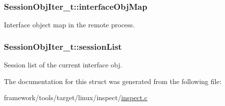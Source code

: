 \subsubsection[{\texorpdfstring{interface\+Obj\+Map}{interfaceObjMap}}]{ Session\+Obj\+Iter\+\_\+t\+::interface\+Obj\+Map}\hypertarget{struct_session_obj_iter__t_ac3db9e07ac50a35f02c9bc6dd5e09ae1}{}\label{struct_session_obj_iter__t_ac3db9e07ac50a35f02c9bc6dd5e09ae1}


Interface object map in the remote process. 

\subsubsection[{\texorpdfstring{session\+List}{sessionList}}]{ Session\+Obj\+Iter\+\_\+t\+::session\+List}\hypertarget{struct_session_obj_iter__t_ac94a6770e7d8c8d0c8fc85e93f0297a7}{}\label{struct_session_obj_iter__t_ac94a6770e7d8c8d0c8fc85e93f0297a7}


Session list of the current interface obj. 



The documentation for this struct was generated from the following file\+:\begin{DoxyCompactItemize}
\item 
framework/tools/target/linux/inspect/\hyperlink{inspect_8c}{inspect.\+c}\end{DoxyCompactItemize}
